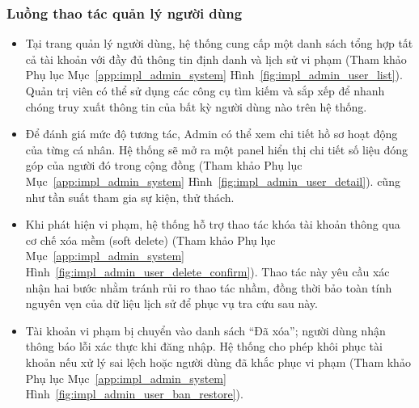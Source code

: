 \subsubsection{Luồng thao tác quản lý người dùng}
\begin{itemize}
    \item Tại trang quản lý người dùng, hệ thống cung cấp một danh sách tổng hợp tất cả tài khoản với đầy đủ thông tin định danh và lịch sử vi phạm (Tham khảo Phụ lục Mục~\ref{app:impl_admin_system} Hình~\ref{fig:impl_admin_user_list}). Quản trị viên có thể sử dụng các công cụ tìm kiếm và sắp xếp để nhanh chóng truy xuất thông tin của bất kỳ người dùng nào trên hệ thống.


    \item Để đánh giá mức độ tương tác, Admin có thể xem chi tiết hồ sơ hoạt động của từng cá nhân. Hệ thống sẽ mở ra một panel hiển thị chi tiết số liệu đóng góp của người đó trong cộng đồng (Tham khảo Phụ lục Mục~\ref{app:impl_admin_system} Hình~\ref{fig:impl_admin_user_detail}). cũng như tần suất tham gia sự kiện, thử thách.


    \item Khi phát hiện vi phạm, hệ thống hỗ trợ thao tác khóa tài khoản thông qua cơ chế xóa mềm (soft delete) (Tham khảo Phụ lục Mục~\ref{app:impl_admin_system} Hình~\ref{fig:impl_admin_user_delete_confirm}). Thao tác này yêu cầu xác nhận hai bước nhằm tránh rủi ro thao tác nhầm, đồng thời bảo toàn tính nguyên vẹn của dữ liệu lịch sử để phục vụ tra cứu sau này.


    \item Tài khoản vi phạm bị chuyển vào danh sách ``Đã xóa''; người dùng nhận thông báo lỗi xác thực khi đăng nhập. Hệ thống cho phép khôi phục tài khoản nếu xử lý sai lệch hoặc người dùng đã khắc phục vi phạm (Tham khảo Phụ lục Mục~\ref{app:impl_admin_system} Hình~\ref{fig:impl_admin_user_ban_restore}).

\end{itemize}

